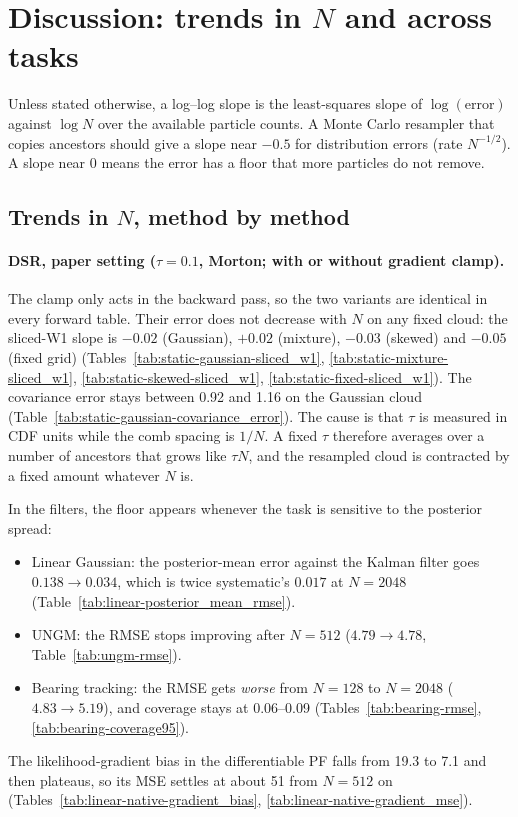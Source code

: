 \clearpage
\section*{Discussion: trends in $N$ and across tasks}

Unless stated otherwise, a log--log slope is the least-squares slope of $\log(\text{error})$ against $\log N$ over the available particle counts. A Monte Carlo resampler that copies ancestors should give a slope near $-0.5$ for distribution errors (rate $N^{-1/2}$). A slope near $0$ means the error has a floor that more particles do not remove.

\subsection*{Trends in $N$, method by method}

\paragraph{DSR, paper setting ($\tau{=}0.1$, Morton; with or without gradient clamp).}
The clamp only acts in the backward pass, so the two variants are identical in every forward table. Their error does not decrease with $N$ on any fixed cloud: the sliced-W1 slope is $-0.02$ (Gaussian), $+0.02$ (mixture), $-0.03$ (skewed) and $-0.05$ (fixed grid) (Tables~\ref{tab:static-gaussian-sliced_w1}, \ref{tab:static-mixture-sliced_w1}, \ref{tab:static-skewed-sliced_w1}, \ref{tab:static-fixed-sliced_w1}). The covariance error stays between 0.92 and 1.16 on the Gaussian cloud (Table~\ref{tab:static-gaussian-covariance_error}). The cause is that $\tau$ is measured in CDF units while the comb spacing is $1/N$. A fixed $\tau$ therefore averages over a number of ancestors that grows like $\tau N$, and the resampled cloud is contracted by a fixed amount whatever $N$ is.

In the filters, the floor appears whenever the task is sensitive to the posterior spread:
\begin{itemize}
\item Linear Gaussian: the posterior-mean error against the Kalman filter goes $0.138\to0.034$, which is twice systematic's $0.017$ at $N{=}2048$ (Table~\ref{tab:linear-posterior_mean_rmse}).
\item UNGM: the RMSE stops improving after $N{=}512$ ($4.79\to4.78$, Table~\ref{tab:ungm-rmse}).
\item Bearing tracking: the RMSE gets \emph{worse} from $N{=}128$ to $N{=}2048$ ($4.83\to5.19$), and coverage stays at 0.06--0.09 (Tables~\ref{tab:bearing-rmse}, \ref{tab:bearing-coverage95}).
\end{itemize}
The likelihood-gradient bias in the differentiable PF falls from 19.3 to 7.1 and then plateaus, so its MSE settles at about 51 from $N{=}512$ on (Tables~\ref{tab:linear-native-gradient_bias}, \ref{tab:linear-native-gradient_mse}).


